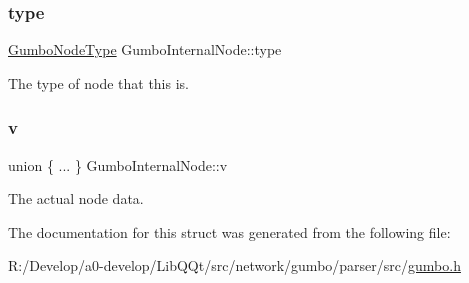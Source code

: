 \subsubsection{\texorpdfstring{type}{type}}
{\footnotesize\ttfamily \mbox{\hyperlink{gumbo_8h_a74e7c5d1cb8189fcfad8443ce4c44ee0}{Gumbo\+Node\+Type}} Gumbo\+Internal\+Node\+::type}

The type of node that this is. \mbox{\label{struct_gumbo_internal_node_af96cda8b23b42df19d16a27a857515a2}} 
\subsubsection{\texorpdfstring{v}{v}}
{\footnotesize\ttfamily union \{ ... \}   Gumbo\+Internal\+Node\+::v}

The actual node data. 

The documentation for this struct was generated from the following file\+:\begin{DoxyCompactItemize}
\item 
R\+:/\+Develop/a0-\/develop/\+Lib\+Q\+Qt/src/network/gumbo/parser/src/\mbox{\hyperlink{gumbo_8h}{gumbo.\+h}}\end{DoxyCompactItemize}
